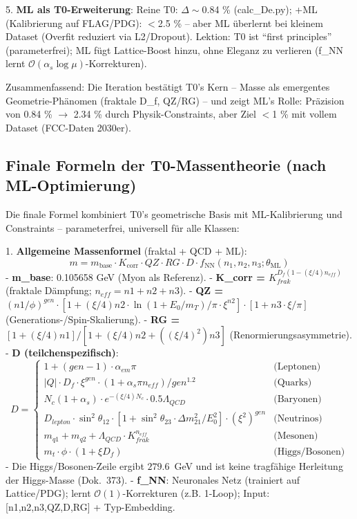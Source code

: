 	5. \textbf{ML als T0-Erweiterung}: Reine T0: $\Delta \sim$0.84 \% (calc\_De.py); +ML (Kalibrierung auf FLAG/PDG): $<$2.5 \% – aber ML überlernt bei kleinem Dataset (Overfit reduziert via L2/Dropout). Lektion: T0 ist ``first principles'' (parameterfrei); ML fügt Lattice-Boost hinzu, ohne Eleganz zu verlieren (f\_NN lernt $\mathcal{O}(\alpha_s \log \mu)$-Korrekturen).
	
	Zusammenfassend: Die Iteration bestätigt T0's Kern – Masse als emergentes Geometrie-Phänomen (fraktale D\_f, QZ/RG) – und zeigt ML's Rolle: Präzision von 0.84 \% $\rightarrow$ 2.34 \% durch Physik-Constraints, aber Ziel $<$1 \% mit vollem Dataset (FCC-Daten 2030er).
	
	\subsection*{Finale Formeln der T0-Massentheorie (nach ML-Optimierung)}
	Die finale Formel kombiniert T0's geometrische Basis mit ML-Kalibrierung und Constraints – parameterfrei, universell für alle Klassen:
	
	1. \textbf{Allgemeine Massenformel} (fraktal + QCD + ML):
	\[
	\boxed{m = m_{\text{base}} \cdot K_{\text{corr}} \cdot QZ \cdot RG \cdot D \cdot f_{\text{NN}}(n_1, n_2, n_3; \theta_{\text{ML}})}
	\]
	- \textbf{m\_base}: 0.105658 GeV (Myon als Referenz).
	- \textbf{K\_corr = $K_{frak}^{D_f (1 - (\xi/4) n_{eff})}$} (fraktale Dämpfung; $n_{eff} = n1 + n2 + n3$).
	- \textbf{QZ = $(n1 / \phi)^{gen} \cdot [1 + (\xi/4) n2 \cdot \ln(1 + E_0 / m_T) / \pi \cdot \xi^{n2}] \cdot [1 + n3 \cdot \xi / \pi]$} (Generations-/Spin-Skalierung).
	- \textbf{RG = $[1 + (\xi/4) n1] / [1 + (\xi/4) n2 + ((\xi/4)^2) n3]$} (Renormierungsasymmetrie).
	- \textbf{D (teilchenspezifisch)}:
	\[
	D =
	\begin{cases}
		1 + (gen - 1) \cdot \alpha_{em} \pi & \text{(Leptonen)} \\
		|Q| \cdot D_f \cdot \xi^{gen} \cdot (1 + \alpha_s \pi n_{eff}) / gen^{1.2} & \text{(Quarks)} \\
		N_c (1 + \alpha_s) \cdot e^{-(\xi/4) N_c} \cdot 0.5 \Lambda_{QCD} & \text{(Baryonen)} \\
		D_{lepton} \cdot \sin^2 \theta_{12} \cdot [1 + \sin^2 \theta_{23} \cdot \Delta m^2_{21} / E_0^2] \cdot (\xi^2)^{gen} & \text{(Neutrinos)} \\
		m_{q1} + m_{q2} + \Lambda_{QCD} \cdot K_{frak}^{n_{eff}} & \text{(Mesonen)} \\
		m_t \cdot \phi \cdot (1 + \xi D_f) & \text{(Higgs/Bosonen)}
	\end{cases}
	\]
	- Die Higgs/Bosonen-Zeile ergibt $279.6$~GeV und ist keine tragfähige Herleitung der Higgs-Masse (Dok.~373).
	- \textbf{f\_NN}: Neuronales Netz (trainiert auf Lattice/PDG); lernt $\mathcal{O}(1)$-Korrekturen (z.B. 1-Loop); Input: [n1,n2,n3,QZ,D,RG] + Typ-Embedding.
	
